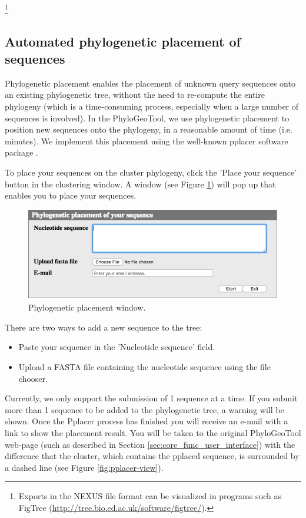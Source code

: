 \documentclass[a4paper, 11pt]{article} %
\begin{document}
\footnote{Exports in the NEXUS file format can be visualized in programs such as FigTree (\url{http://tree.bio.ed.ac.uk/software/figtree/}).}  

\subsection{Automated phylogenetic placement of sequences}
Phylogenetic placement enables the placement of unknown query sequences onto an existing phylogenetic tree, without the need to re-compute the entire phylogeny (which is a time-consuming process, especially when a large number of sequences is involved). 
In the PhyloGeoTool, we use phylogenetic placement to position new sequences onto the phylogeny, in a reasonable amount of time (i.e. minutes). 
We implement this placement using the well-known pplacer software package \cite{Matsen2010}.

To place your sequences on the cluster phylogeny, click the 'Place your sequence' button in the clustering window. 
A window (see Figure \ref{fig:pplacerwindow}) will pop up that enables you to place your sequences. 

\begin{figure}[H]
\centering
\includegraphics[scale=0.50]{images/pplacerWindow.png}
\vspace{-0.25cm}
\caption{Phylogenetic placement window.}
\label{fig:pplacerwindow}
\end{figure}

\noindent There are two ways to add a new sequence to the tree:
\begin{itemize}
\item Paste your sequence in the 'Nucleotide sequence' field.
\item Upload a FASTA file containing the nucleotide sequence using the file chooser.
\end{itemize}
Currently, we only support the submission of 1 sequence at a time.
If you submit more than 1 sequence to be added to the phylogenetic tree, a warning will be shown.
Once the Pplacer process has finished you will receive an e-mail with a link to show the placement result.
You will be taken to the original PhyloGeoTool web-page (such as described in Section \ref{sec:core_func_user_interface}) with the difference that the cluster, which contains the pplaced sequence, is surrounded by a dashed line (see Figure \ref{fig:pplacer-view}). 
\end{document}
